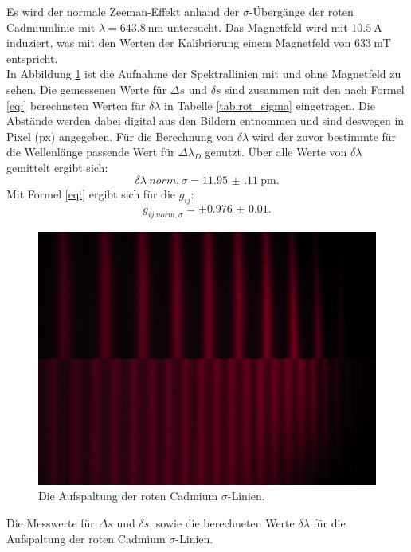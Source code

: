 Es wird der normale Zeeman-Effekt anhand der $\sigma$-Übergänge der roten Cadmiumlinie mit $\lambda=\SI{643.8}{\nano\metre}$ untersucht. Das Magnetfeld wird mit $\SI{10.5}{\ampere}$ induziert, was mit den Werten der Kalibrierung einem Magnetfeld von $\SI{633}{\milli\tesla}$ entspricht.\\
In Abbildung \ref{fig:rot_sigma} ist die Aufnahme der Spektrallinien mit und ohne Magnetfeld zu sehen. Die gemessenen Werte für $\Delta s$ und $\delta s$ sind zusammen mit den nach Formel \eqref{eq:} berechneten Werten für $\delta\lambda$ in Tabelle \ref{tab:rot_sigma} eingetragen. Die Abstände werden dabei digital aus den Bildern entnommen und sind deswegen in Pixel (px) angegeben. Für die Berechnung von $\delta\lambda$ wird der zuvor bestimmte für die Wellenlänge passende Wert für $\Delta\lambda_D$ genutzt.
Über alle Werte von $\delta\lambda$ gemittelt ergibt sich:
\[
\delta\lambda_.{norm,\sigma} = \SI{11.95(11)}{\pico\metre}\text{.}
\]
Mit Formel \eqref{eq:} ergibt sich für die $g_{ij}$:
\[
g_{ij_.{norm,\sigma}} = \pm\num{0.976(10)}\text{.}
\]

\begin{figure}
	\centering
	\includegraphics[width=\linewidth-130pt,height=\textheight-130pt,keepaspectratio]{content/images/rot_sigma.jpg}
	\caption{Die Aufspaltung der roten Cadmium $\sigma$-Linien.}
	\label{fig:rot_sigma}
\end{figure}

\begin{table}
	\centering
	\caption{Die Messwerte für $\Delta s$ und $\delta s$, sowie die berechneten Werte $\delta\lambda$ für die Aufspaltung der roten Cadmium $\sigma$-Linien.}
	
	\label{tab:rot_sigma}
\end{table}

